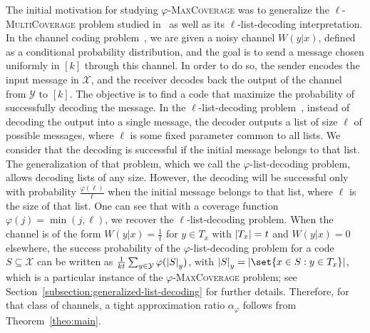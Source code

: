 The initial motivation for studying $\varphi$-\textsc{MaxCoverage} was to generalize the $\ell$-\textsc{MultiCoverage} problem studied in~\cite{BFGG20} as well as its $\ell$-list-decoding interpretation. In the channel coding problem~\cite{BF18}, we are given a noisy channel $W(y|x)$, defined as a conditional probability distribution, and the goal is to send a message chosen uniformly in $[k]$ through this channel. In order to do so, the sender encodes the input message in $\mathcal{X}$, and the receiver decodes back the output of the channel from $\mathcal{Y}$ to $[k]$. The objective is to find a code that maximize the probability of successfully decoding the message. In the $\ell$-list-decoding problem~\cite{Elias57,Wozencraft58}, instead of decoding the output into a single message, the decoder outputs a list of size $\ell$ of possible messages, where $\ell$ is some fixed parameter common to all lists. We consider that the decoding is successful if the initial message belongs to that list. The generalization of that problem, which we call the $\varphi$-list-decoding problem, allows decoding lists of any size.  However, the decoding will be successful only with probability $\frac{\varphi(\ell)}{\ell}$ when the initial message belongs to that list, where $\ell$ is the size of that list. One can see that with a coverage function $\varphi(j) = \min(j,\ell)$, we recover the $\ell$-list-decoding problem. When the channel is of the form $W(y|x) = \frac{1}{t}$ for $y \in T_x$ with $\abs{T_x}=t$ and $W(y|x) = 0$ elsewhere, the success probability of the $\varphi$-list-decoding problem for a code $S\subseteq \mathcal{X}$ can be written as $\frac{1}{kt}\sum_{y \in \mathcal{Y}}\varphi(\abs{S}_y)$, with $\abs{S}_y = \abs{\set{x \in S : y \in T_x}}$, which is a particular instance of the $\varphi$-\textsc{MaxCoverage} problem; see Section~\ref{subsection:generalized-list-decoding} for further details. Therefore, for that class of channels, a tight approximation ratio $\alpha_{\varphi}$ follows from Theorem~\ref{theo:main}.

